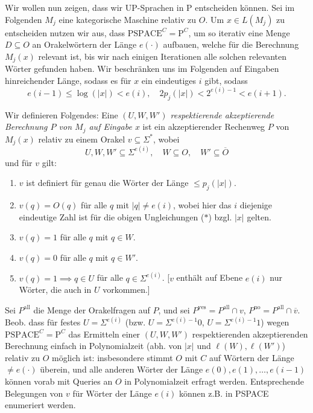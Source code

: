 \documentclass[nofonts]{uebung}
\theoremstyle{definition}
\def\P{\ensuremath{\mathrm{P}}}
\begin{document}
Wir wollen nun zeigen, dass wir UP-Sprachen in P entscheiden können. Sei im Folgenden $M_j$ eine kategorische Maschine relativ zu $O$. Um $x\in L(M_j)$ zu entscheiden nutzen wir aus, dass $\mathrm{PSPACE}^C=\P^C$, um so iterativ eine Menge $D\subseteq O$ an Orakelwörtern der Länge $e(\cdot)$ aufbauen, welche für die Berechnung $M_j(x)$ relevant ist, bis wir nach einigen Iterationen alle solchen relevanten Wörter gefunden haben. 
Wir beschränken uns im Folgenden auf Eingaben hinreichender Länge, sodass es für $x$ ein eindeutiges $i$ gibt, sodass
\[ e(i-1) \leq \log(|x|) < e(i), \quad 2p_j(|x|)< 2^{e(i)-1} < e(i+1).\tag{\ast} \]

Wir definieren Folgendes: %
Eine \emph{$(U, W, W')$ respektierende akzeptierende Berechnung $P$ von $M_j$ auf Eingabe $x$} ist ein akzeptierender Rechenweg $P$ von $M_j(x)$ relativ zu einem Orakel $v\subseteq\Sigma^*$, wobei 
\[ U, W,W'\subseteq \Sigma^{e(i)}, \quad W\subseteq O, \quad W'\subseteq\overline{O} \]
und für $v$ gilt:
\begin{enumerate}[noitemsep,label=\arabic*.]
    \item $v$ ist definiert für genau die Wörter der Länge $\leq p_j(|x|)$.
    \item $v(q)=O(q)$ für alle $q$ mit $|q|\neq  e(i)$, wobei hier das $i$ diejenige eindeutige Zahl ist für die obigen Ungleichungen ($\ast$) bzgl. $|x|$ gelten.
    \item $v(q)=1$ für alle $q$ mit $q\in W$.
    \item $v(q)=0$ für alle $q$ mit $q\in W'$.
    \item $v(q)=1 \implies q\in U$ für alle $q\in\Sigma^{e(i)}$. [$v$ enthält auf Ebene $e(i)$ nur Wörter, die auch in $U$ vorkommen.]
\end{enumerate}

Sei $P^\mathrm{all}$ die Menge der Orakelfragen auf $P$, und sei $P^\mathrm{yes}=P^\mathrm{all}\cap v$, $P^\mathrm{no}=P^\mathrm{all}\cap \overline{v}$.
Beob. dass für festes $U=\Sigma^{e(i)}$ (bzw. $U=\Sigma^{e(i)-1}0$, $U=\Sigma^{e(i)-1}1$) wegen $\mathrm{PSPACE}^C=\P^C$ das Ermitteln einer $(U, W, W')$ respektierenden akzeptierenden Berechnung einfach in Polynomialzeit (abh. von $|x|$ und $\ell(W),\ell(W')$) relativ zu $O$ möglich ist: insbesondere stimmt $O$ mit $C$ auf Wörtern der Länge $\neq e(\cdot)$ überein, und alle anderen Wörter der Länge $e(0), e(1), \dots, e(i-1)$ können vorab mit Queries an $O$ in Polynomialzeit erfragt werden.
Entsprechende Belegungen von $v$ für Wörter der Länge $e(i)$ können z.B. in PSPACE enumeriert werden.
\end{document}

